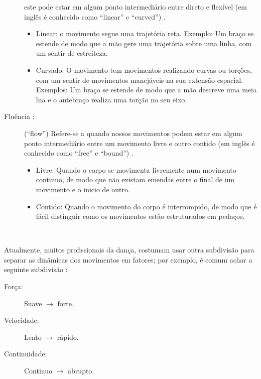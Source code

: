 \begin{description}
este pode estar em algum ponto intermediário entre  direto  e  flexível 
(em inglês é conhecido como  ``linear'' e ``curved'') 
\cite[pp. 143]{laban1987dominio} \cite[pp. 6]{carline2011lesson} \cite[pp. 28]{elementosdanca2017}.
\begin{itemize}
\item Linear: o movimento segue uma trajetória reta. Exemplo:
Um braço se estende de modo que a mão gere uma trajetória sobre uma linha,
com um sentir de estreiteza.
\item Curvado: O movimento tem movimentos realizando curvas ou torções,
com um sentir de movimentos manejáveis na sua extensão espacial. 
Exemplos: Um braço se estende de modo que a mão descreve uma meia lua e o antebraço realiza uma torção no seu eixo.
\end{itemize}
\item[Fluência :] (``flow'') Refere-se a quando nossos movimentos podem 
estar em algum ponto intermediário entre um movimento livre  e outro contido 
(em inglês é conhecido como   ``free'' e ``bound'')
\cite[pp. 140-143]{laban1987dominio} \cite[pp. 6]{carline2011lesson} \cite[pp. 27]{elementosdanca2017}.
\begin{itemize}
\item Livre: Quando o corpo se movimenta livremente num movimento continuo,
de modo que não existam emendas entre o final de um movimento e o inicio de outro.
\item Contido: Quando o movimento do corpo é interrompido,
de modo que é fácil distinguir como os movimentos estão estruturados em pedaços.
\end{itemize}
\end{description}~


Atualmente, muitos profissionais da dança, 
 costumam usar outra subdivisão para separar as dinâmicas dos movimentos em fatores;
por exemplo, é comum achar a seguinte subdivisão  \cite[pp. 30]{paine2014complete}:
\begin{description}
\item[Força:] Suave $\rightarrow$ forte. 
\item[Velocidade:] Lento $\rightarrow$ rápido. 
\item[Continuidade:]  Continuo $\rightarrow$ abrupto.
\end{description}~

